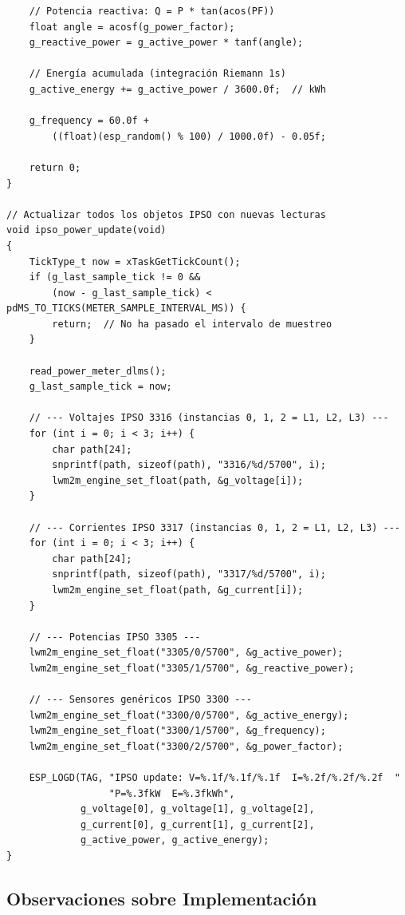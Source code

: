 \begin{verbatim}
    // Potencia reactiva: Q = P * tan(acos(PF))
    float angle = acosf(g_power_factor);
    g_reactive_power = g_active_power * tanf(angle);

    // Energía acumulada (integración Riemann 1s)
    g_active_energy += g_active_power / 3600.0f;  // kWh

    g_frequency = 60.0f +
        ((float)(esp_random() % 100) / 1000.0f) - 0.05f;

    return 0;
}

// Actualizar todos los objetos IPSO con nuevas lecturas
void ipso_power_update(void)
{
    TickType_t now = xTaskGetTickCount();
    if (g_last_sample_tick != 0 &&
        (now - g_last_sample_tick) < pdMS_TO_TICKS(METER_SAMPLE_INTERVAL_MS)) {
        return;  // No ha pasado el intervalo de muestreo
    }

    read_power_meter_dlms();
    g_last_sample_tick = now;

    // --- Voltajes IPSO 3316 (instancias 0, 1, 2 = L1, L2, L3) ---
    for (int i = 0; i < 3; i++) {
        char path[24];
        snprintf(path, sizeof(path), "3316/%d/5700", i);
        lwm2m_engine_set_float(path, &g_voltage[i]);
    }

    // --- Corrientes IPSO 3317 (instancias 0, 1, 2 = L1, L2, L3) ---
    for (int i = 0; i < 3; i++) {
        char path[24];
        snprintf(path, sizeof(path), "3317/%d/5700", i);
        lwm2m_engine_set_float(path, &g_current[i]);
    }

    // --- Potencias IPSO 3305 ---
    lwm2m_engine_set_float("3305/0/5700", &g_active_power);
    lwm2m_engine_set_float("3305/1/5700", &g_reactive_power);

    // --- Sensores genéricos IPSO 3300 ---
    lwm2m_engine_set_float("3300/0/5700", &g_active_energy);
    lwm2m_engine_set_float("3300/1/5700", &g_frequency);
    lwm2m_engine_set_float("3300/2/5700", &g_power_factor);

    ESP_LOGD(TAG, "IPSO update: V=%.1f/%.1f/%.1f  I=%.2f/%.2f/%.2f  "
                  "P=%.3fkW  E=%.3fkWh",
             g_voltage[0], g_voltage[1], g_voltage[2],
             g_current[0], g_current[1], g_current[2],
             g_active_power, g_active_energy);
}
\end{verbatim}

\subsection{Observaciones sobre Implementación}

